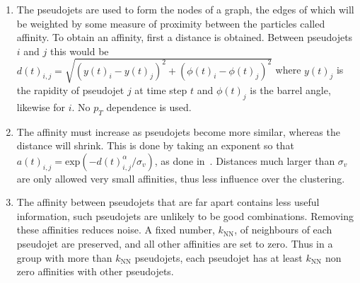     \begin{enumerate}
        \item \label{step:start} The pseudojets are used to form the nodes of a graph,
        the edges of which will be weighted by some measure of proximity between the particles called affinity.
        To obtain an affinity, first a distance is obtained.
        Between pseudojets \(i\) and \(j\) this would be \(d(t)_{i,j} = \sqrt{(y(t)_i - y(t)_j)^2 + (\phi(t)_i - \phi(t)_j)^2}\)
        where \(y(t)_j\) is the rapidity of pseudojet \(j\) at time step \(t\) and \(\phi(t)_j\) is the barrel angle, likewise for \(i\).
        No \(p_T\) dependence is used.

    \item \label{step:affinity} The affinity must increase as pseudojets become more similar, whereas the distance will shrink.
        This is done by taking an exponent so that \(a(t)_{i,j} = \text{exp}(-d(t)_{i,j}^\alpha/\sigma_v)\), as done in~\cite{hadjighasem2016votex}.
            Distances much larger than \(\sigma_v\) are only allowed very small affinities,
            thus less influence over the clustering.

    \item\label{step:KNN} The affinity between pseudojets that are far apart contains less useful information,
        such pseudojets are unlikely to be good combinations.
        Removing these affinities reduces noise.
    A fixed number, \(k_\text{NN}\), of neighbours of each pseudojet are
    preserved, and all other affinities are set to zero.
    Thus in a group with more than \(k_\text{NN}\) pseudojets,
    each pseudojet has at least \(k_\text{NN}\) non zero affinities with other pseudojets.


\end{enumerate}
